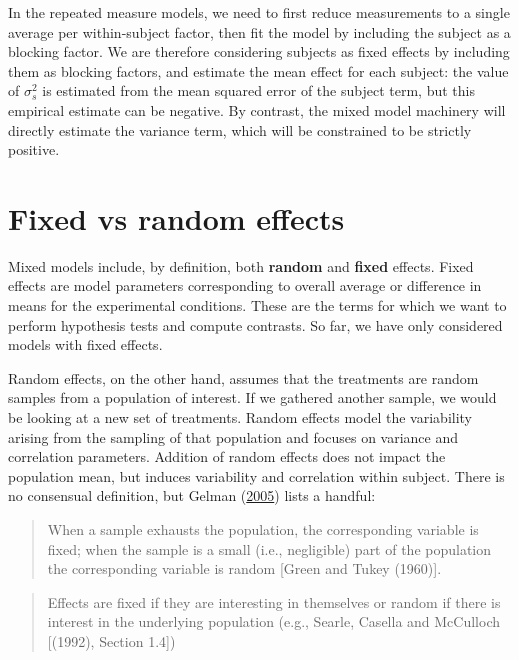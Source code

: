 \documentclass[
  11pt,
  letterpaper,
]{scrbook}
\theoremstyle{definition}
\theoremstyle{remark}
\begin{document}
In the repeated measure models, we need to first reduce measurements to
a single average per within-subject factor, then fit the model by
including the subject as a blocking factor. We are therefore considering
subjects as fixed effects by including them as blocking factors, and
estimate the mean effect for each subject: the value of \(\sigma^2_s\)
is estimated from the mean squared error of the subject term, but this
empirical estimate can be negative. By contrast, the mixed model
machinery will directly estimate the variance term, which will be
constrained to be strictly positive.

\hypertarget{fixed-vs-random-effects}{%
\section{Fixed vs random effects}\label{fixed-vs-random-effects}}

Mixed models include, by definition, both \textbf{random} and
\textbf{fixed} effects. Fixed effects are model parameters corresponding
to overall average or difference in means for the experimental
conditions. These are the terms for which we want to perform hypothesis
tests and compute contrasts. So far, we have only considered models with
fixed effects.

Random effects, on the other hand, assumes that the treatments are
random samples from a population of interest. If we gathered another
sample, we would be looking at a new set of treatments. Random effects
model the variability arising from the sampling of that population and
focuses on variance and correlation parameters. Addition of random
effects does not impact the population mean, but induces variability and
correlation within subject. There is no consensual definition, but
Gelman (\protect\hyperlink{ref-Gelman:2005}{2005}) lists a handful:

\begin{quote}
When a sample exhausts the population, the corresponding variable is
fixed; when the sample is a small (i.e., negligible) part of the
population the corresponding variable is random {[}Green and Tukey
(1960){]}.
\end{quote}

\begin{quote}
Effects are fixed if they are interesting in themselves or random if
there is interest in the underlying population (e.g., Searle, Casella
and McCulloch {[}(1992), Section 1.4{]})
\end{quote}
\end{document}
